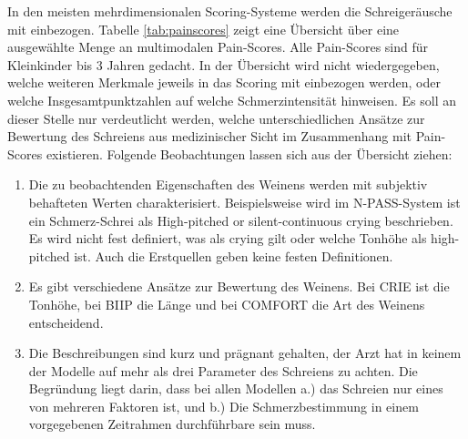 In den meisten mehrdimensionalen Scoring-Systeme werden die Schreigeräusche mit einbezogen. Tabelle \ref{tab:painscores} zeigt eine Übersicht über eine ausgewählte Menge an multimodalen Pain-Scores. Alle Pain-Scores sind für Kleinkinder bis 3 Jahren gedacht. In der Übersicht wird nicht wiedergegeben, welche weiteren Merkmale jeweils in das Scoring mit einbezogen werden, oder welche Insgesamtpunktzahlen auf welche Schmerzintensität hinweisen. Es soll an dieser Stelle nur verdeutlicht werden, welche unterschiedlichen Ansätze zur Bewertung des Schreiens aus medizinischer Sicht im Zusammenhang mit Pain-Scores existieren. Folgende Beobachtungen lassen sich aus der Übersicht ziehen:

\begin{enumerate}

\item Die zu beobachtenden Eigenschaften des Weinens werden mit subjektiv behafteten Werten charakterisiert. Beispielsweise wird im N-PASS-System ist ein Schmerz-Schrei als \glqq High-pitched or silent-continuous crying\grqq{} beschrieben. Es wird nicht fest definiert, was als \glqq crying\grqq{} gilt oder welche Tonhöhe als \glqq high-pitched\grqq{} ist. Auch die Erstquellen geben keine festen Definitionen.

\item Es gibt verschiedene Ansätze zur Bewertung des Weinens. Bei CRIE ist die Tonhöhe, bei BIIP die Länge und bei COMFORT die Art des Weinens entscheidend.

\item Die Beschreibungen sind kurz und prägnant gehalten, der Arzt hat in keinem der Modelle auf mehr als drei Parameter des Schreiens zu achten. Die Begründung liegt darin, dass bei allen Modellen a.) das Schreien nur eines von mehreren Faktoren ist, und b.) Die Schmerzbestimmung in einem vorgegebenen Zeitrahmen durchführbare sein muss.

\end{enumerate}

